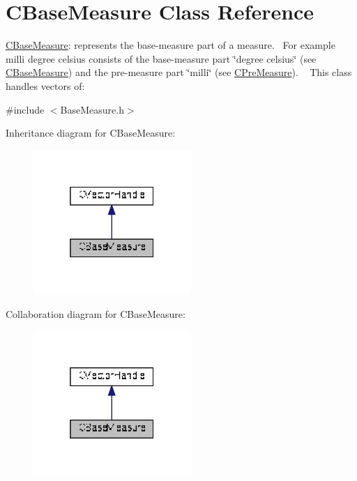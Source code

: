 \hypertarget{classCBaseMeasure}{}\section{C\+Base\+Measure Class Reference}
\label{classCBaseMeasure}


\hyperlink{classCBaseMeasure}{C\+Base\+Measure}\+: represents the base-\/measure part of a measure.~\newline
 For example milli degree celsius consists of the base-\/measure part \char`\"{}degree celsius\char`\"{} (see \hyperlink{classCBaseMeasure}{C\+Base\+Measure}) and the pre-\/measure part \char`\"{}milli\char`\"{} (see \hyperlink{classCPreMeasure}{C\+Pre\+Measure}). ~\newline
 This class handles vectors of\+:  




{\ttfamily \#include $<$Base\+Measure.\+h$>$}



Inheritance diagram for C\+Base\+Measure\+:\nopagebreak
\begin{figure}[H]
\begin{center}
\leavevmode
\includegraphics[width=169pt]{d6/d40/classCBaseMeasure__inherit__graph}
\end{center}
\end{figure}


Collaboration diagram for C\+Base\+Measure\+:\nopagebreak
\begin{figure}[H]
\begin{center}
\leavevmode
\includegraphics[width=169pt]{de/d06/classCBaseMeasure__coll__graph}
\end{center}
\end{figure}
